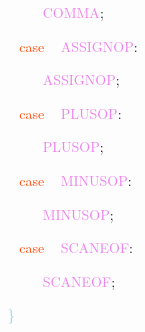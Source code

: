 \documentclass[8, usernames, dvipsnames]{beamer}
\begin{document}
\begin{frame}
\textcolor{White}{\   }
\textcolor{White}{\   }
\textcolor{White}{\   }
\textcolor{OrangeRed}{	}
\textcolor{White}{\ }
\textcolor{Violet}{COMMA}\textcolor{Sepia}{;}

 \textcolor{White}{\   }
\textcolor{White}{\   }
\textcolor{OrangeRed}{case}
\textcolor{White}{\ }
\textcolor{Violet}{ASSIGNOP}\textcolor{Sepia}{:}

 \textcolor{White}{\   }
\textcolor{White}{\   }
\textcolor{White}{\   }
\textcolor{OrangeRed}{	}
\textcolor{White}{\ }
\textcolor{Violet}{ASSIGNOP}\textcolor{Sepia}{;}

 \textcolor{White}{\   }
\textcolor{White}{\   }
\textcolor{OrangeRed}{case}
\textcolor{White}{\ }
\textcolor{Violet}{PLUSOP}\textcolor{Sepia}{:}

 \textcolor{White}{\   }
\textcolor{White}{\   }
\textcolor{White}{\   }
\textcolor{OrangeRed}{	}
\textcolor{White}{\ }
\textcolor{Violet}{PLUSOP}\textcolor{Sepia}{;}

 \textcolor{White}{\   }
\textcolor{White}{\   }
\textcolor{OrangeRed}{case}
\textcolor{White}{\ }
\textcolor{Violet}{MINUSOP}\textcolor{Sepia}{:}

 \textcolor{White}{\   }
\textcolor{White}{\   }
\textcolor{White}{\   }
\textcolor{OrangeRed}{	}
\textcolor{White}{\ }
\textcolor{Violet}{MINUSOP}\textcolor{Sepia}{;}

 \textcolor{White}{\   }
\textcolor{White}{\   }
\textcolor{OrangeRed}{case}
\textcolor{White}{\ }
\textcolor{Violet}{SCANEOF}\textcolor{Sepia}{:}

 \textcolor{White}{\   }
\textcolor{White}{\   }
\textcolor{White}{\   }
\textcolor{OrangeRed}{	}
\textcolor{White}{\ }
\textcolor{Violet}{SCANEOF}\textcolor{Sepia}{;}

 \textcolor{White}{\   }
\textcolor{SkyBlue}{\} }

 \end{frame}
\end{document}
